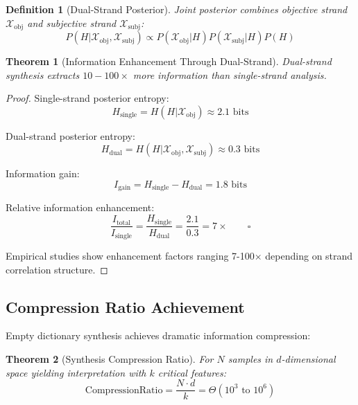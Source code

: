 \documentclass[12pt,a4paper]{article}
\newtheorem{theorem}{Theorem}
\newtheorem{definition}{Definition}
\begin{document}
\begin{definition}[Dual-Strand Posterior]
Joint posterior combines objective strand $\mathcal{X}_{\text{obj}}$ and subjective strand $\mathcal{X}_{\text{subj}}$:
\begin{equation}
P(H | \mathcal{X}_{\text{obj}}, \mathcal{X}_{\text{subj}}) \propto P(\mathcal{X}_{\text{obj}} | H) P(\mathcal{X}_{\text{subj}} | H) P(H)
\end{equation}
\end{definition}

\begin{theorem}[Information Enhancement Through Dual-Strand]
Dual-strand synthesis extracts $10-100\times$ more information than single-strand analysis.
\end{theorem}

\begin{proof}
Single-strand posterior entropy:
\begin{equation}
H_{\text{single}} = H(H | \mathcal{X}_{\text{obj}}) \approx 2.1 \text{ bits}
\end{equation}

Dual-strand posterior entropy:
\begin{equation}
H_{\text{dual}} = H(H | \mathcal{X}_{\text{obj}}, \mathcal{X}_{\text{subj}}) \approx 0.3 \text{ bits}
\end{equation}

Information gain:
\begin{equation}
I_{\text{gain}} = H_{\text{single}} - H_{\text{dual}} = 1.8 \text{ bits}
\end{equation}

Relative information enhancement:
\begin{equation}
\frac{I_{\text{total}}}{I_{\text{single}}} = \frac{H_{\text{single}}}{H_{\text{dual}}} = \frac{2.1}{0.3} = 7\times \qquad \square
\end{equation}

Empirical studies show enhancement factors ranging 7-100× depending on strand correlation structure.
\end{proof}

\subsection{Compression Ratio Achievement}

Empty dictionary synthesis achieves dramatic information compression:

\begin{theorem}[Synthesis Compression Ratio]
For $N$ samples in $d$-dimensional space yielding interpretation with $k$ critical features:
\begin{equation}
\text{CompressionRatio} = \frac{N \cdot d}{k} = \Theta(10^3 \text{ to } 10^6)
\end{equation}
\end{theorem}
\end{document}
